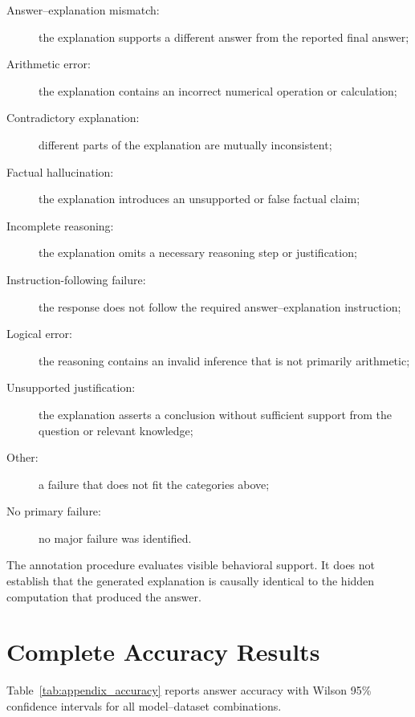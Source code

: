 \begin{description}
    \item[Answer--explanation mismatch:] the explanation supports a different
    answer from the reported final answer;

    \item[Arithmetic error:] the explanation contains an incorrect numerical
    operation or calculation;

    \item[Contradictory explanation:] different parts of the explanation are
    mutually inconsistent;

    \item[Factual hallucination:] the explanation introduces an unsupported or
    false factual claim;

    \item[Incomplete reasoning:] the explanation omits a necessary reasoning
    step or justification;

    \item[Instruction-following failure:] the response does not follow the
    required answer--explanation instruction;

    \item[Logical error:] the reasoning contains an invalid inference that is
    not primarily arithmetic;

    \item[Unsupported justification:] the explanation asserts a conclusion
    without sufficient support from the question or relevant knowledge;

    \item[Other:] a failure that does not fit the categories above;

    \item[No primary failure:] no major failure was identified.
\end{description}

The annotation procedure evaluates visible behavioral support. It does not
establish that the generated explanation is causally identical to the hidden
computation that produced the answer.

\section{Complete Accuracy Results}
\label{app:accuracy}

Table~\ref{tab:appendix_accuracy} reports answer accuracy with Wilson 95\%
confidence intervals for all model--dataset combinations.

